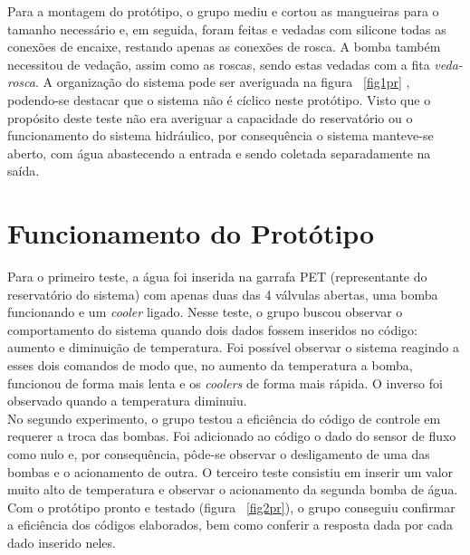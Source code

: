 Para a montagem do protótipo, o grupo mediu e cortou as mangueiras para o tamanho necessário e, em seguida, foram feitas e vedadas com silicone todas as conexões de encaixe, restando apenas as conexões de rosca. A bomba também necessitou de vedação, assim como as roscas, sendo estas vedadas com a fita \emph{veda-rosca}. A organização do sistema pode ser averiguada na figura ~\ref{fig1pr} , podendo-se destacar que o sistema não é cíclico neste protótipo. Visto que o propósito deste teste não era averiguar a capacidade do reservatório ou o funcionamento do sistema hidráulico, por consequência o sistema manteve-se aberto, com água abastecendo a entrada e sendo coletada separadamente na saída.
\section{Funcionamento do Protótipo}
Para o primeiro teste, a água foi inserida na garrafa PET (representante do reservatório do sistema) com apenas duas das 4 válvulas abertas, uma bomba funcionando e um \textit{cooler} ligado. Nesse teste, o grupo buscou observar o comportamento do sistema quando dois dados fossem inseridos no código: aumento e diminuição de temperatura. Foi possível observar o sistema reagindo a esses dois comandos de modo que, no aumento da temperatura a bomba, funcionou de forma mais lenta e os \textit{coolers} de forma mais rápida. O inverso foi observado quando a temperatura diminuiu.\\
No segundo experimento, o grupo testou a eficiência do código de controle em requerer a troca das bombas. Foi adicionado ao código o dado do sensor de fluxo como nulo e, por consequência, pôde-se observar o desligamento de uma das bombas e o acionamento de outra.  
O terceiro teste consistiu em inserir um valor muito alto de temperatura e observar o acionamento da segunda bomba de água.\\
Com o protótipo pronto e testado (figura ~\ref{fig2pr}), o grupo conseguiu confirmar a eficiência dos códigos elaborados, bem como conferir a resposta dada por cada dado inserido neles.
